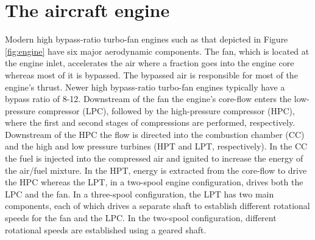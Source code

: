 \section{The aircraft engine\label{ch:engine}}
Modern high bypass-ratio turbo-fan engines such as that depicted in Figure \ref{fig:engine} have six major aerodynamic components. The fan, which is located at the engine inlet, accelerates the air where a fraction goes into the engine core whereas most of it is bypassed. The bypassed air is responsible for most of the engine's thrust. Newer high bypass-ratio turbo-fan engines typically have a bypass ratio of 8-12. Downstream of the fan the engine's core-flow enters the low-pressure compressor (LPC), followed by the high-pressure compressor (HPC), where the first and second stages of compressions are performed, respectively. Downstream of the HPC the flow is directed into the combustion chamber (CC) and the high and low pressure turbines (HPT and LPT, respectively). In the CC the fuel is injected into the compressed air and ignited to increase the energy of the air/fuel mixture. In the HPT, energy is extracted from the core-flow to drive the HPC whereas the LPT, in a two-spool engine configuration, drives both the LPC and the fan. In a three-spool configuration, the LPT has two main components, each of which drives a separate shaft to establish different rotational speeds for the fan and the LPC. In the two-spool configuration, different rotational speeds are established using a geared shaft.

